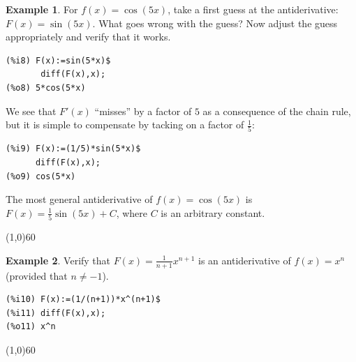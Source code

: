 \documentclass[10.5pt,twoside]{report}
\theoremstyle{definition}
\newtheorem{exmp}{Example}[section]
\begin{document}
\begin{exmp}  For $f(x)=\cos(5x)$, take a first guess at the antiderivative: $F(x)=\sin(5x)$.  What goes wrong with the guess?  Now adjust the guess appropriately and verify that it works.\\

\begin{verbatim}
(%i8) F(x):=sin(5*x)$
       diff(F(x),x);
(%o8) 5*cos(5*x)
\end{verbatim}

We see that $F'(x)$ ``misses'' by a factor of $5$ as a consequence of the chain rule, but it is simple to compensate by tacking on a factor of $\frac{1}{5}$:

\begin{verbatim}
(%i9) F(x):=(1/5)*sin(5*x)$
      diff(F(x),x);
(%o9) cos(5*x)
\end{verbatim} 

The most general antiderivative of $f(x)=\cos(5x)$ is $F(x)=\frac{1}{5}\sin(5x)+C$, where $C$ is an arbitrary constant.

\end{exmp}

\line(1,0){60}
\linethickness{0.5mm}


\begin{exmp}  Verify that $F(x)=\frac{1}{n+1} x^{n+1}$ is an antiderivative of $f(x)=x^n$ (provided that $n \neq -1$).\\


\begin{verbatim}
(%i10) F(x):=(1/(n+1))*x^(n+1)$
(%i11) diff(F(x),x);
(%o11) x^n
\end{verbatim}

\end{exmp}

\line(1,0){60}
\linethickness{0.5mm}
\end{document}
